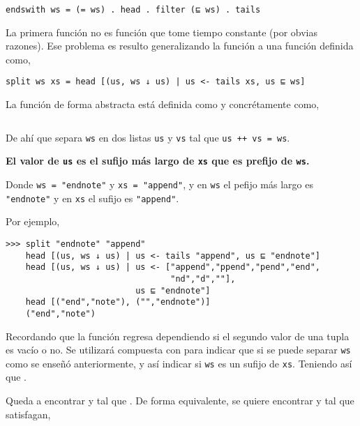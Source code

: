 \begin{verbatim}
endswith ws = (= ws) . head . filter (⊑ ws) . tails
\end{verbatim}

La primera función  no es función que tome tiempo constante (por obvias razones). 
Ese problema es resulto generalizando la función  a una función
 definida como,

\begin{verbatim}
split ws xs = head [(us, ws ↓ us) | us <- tails xs, us ⊑ ws]
\end{verbatim}

La función  de forma abstracta está definida como  y
concrétamente como,

\inputminted{haskell}{definiciones/kmp/1-down-arrow.hs}

De ahí que  separa \texttt{ws} en dos listas \texttt{us} y \texttt{vs} tal que
\texttt{us ++ vs = ws}.

\begin{center}
\textbf{El valor de \texttt{us} es el sufijo más largo de \texttt{xs} que es prefijo de \texttt{ws}.}
\end{center}

Donde \texttt{ws = "{}endnote"} y \texttt{xs = "{}append"}, y en \texttt{ws} el pefijo más largo
es \texttt{"\color{purple}{}end\color{black}note"} y en \texttt{xs} el sufijo es
\texttt{"{}app\color{purple}end\color{black}"}.

Por ejemplo,
\begin{verbatim}
>>> split "endnote" "append"
    head [(us, ws ↓ us) | us <- tails "append", us ⊑ "endnote"]
    head [(us, ws ↓ us) | us <- ["append","ppend","pend","end",
                                 "nd","d",""],
                          us ⊑ "endnote"]
    head [("end","note"), ("","endnote")]
    ("end","note")
\end{verbatim}

Recordando que la función  regresa  dependiendo si el segundo valor
de una tupla es vacío o no. Se utilizará compuesta con  para indicar que si se
puede separar \texttt{ws} como se enseñó anteriormente, y así indicar si \texttt{ws} es un sufijo
de \texttt{xs}. Teniendo así que .

Queda a encontrar  y  tal que . De forma
equivalente, se quiere encontrar  y  tal que satisfagan, 

